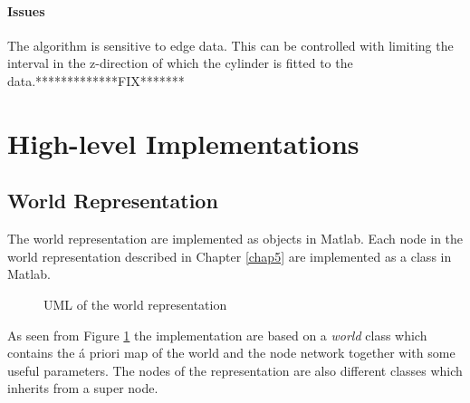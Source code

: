 \paragraph{Issues}
The algorithm is sensitive to edge data. This can be controlled with limiting the interval
in the z-direction of which the cylinder is fitted to the data.*************FIX*******


\section{High-level Implementations}

\subsection{World Representation}
The world representation are implemented as objects in Matlab. Each node in the world
representation described in Chapter \ref{chap5} are implemented as a class in Matlab. 
\begin{figure}[htbp]
    \centering
    \caption{UML of the world representation}
    \label{chap6:fig-world-uml}
\end{figure}

As seen from Figure \ref{chap6:fig-world-uml} the implementation are based on a
\emph{world} class which contains the á priori map of the world and the node network
together with some useful parameters. The nodes of the representation are also different
classes which inherits from a super node. 





